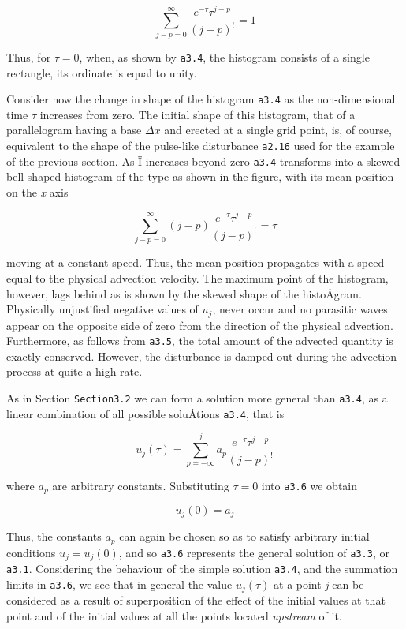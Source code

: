 {\[\sum_{j - p = 0}^{\infty}\frac{e^{- \tau}\tau^{j - p}}{\left( j - p \right)^{!}} = 1\]}

Thus, for \(\tau = 0\), when, as shown by \texttt{a3.4}, the histogram
consists of a single rectangle, its ordinate is equal to unity.

Consider now the change in shape of the histogram \texttt{a3.4} as the
non-dimensional time \(\tau\) increases from zero. The initial shape of
this histogram, that of a parallelogram having a base \(\Delta x\) and
erected at a single grid point, is, of course, equivalent to the shape
of the pulse-like disturbance \texttt{a2.16} used for the example of the
previous section. As Ï increases beyond zero \texttt{a3.4} transforms
into a skewed bell-shaped histogram of the type as shown in the figure,
with its mean position on the \emph{x} axis

\[\sum_{j - p = 0}^{\infty}\left( j - p \right)\frac{e^{- \tau}\tau^{j - p}}{\left( j - p \right)^{!}} = \tau\]

moving at a constant speed. Thus, the mean position propagates with a
speed equal to the physical advection velocity. The maximum point of the
histogram, however, lags behind as is shown by the skewed shape of the
histoÂ­gram. Physically unjustified negative values of \(u_{j}\), never
occur and no parasitic waves appear on the opposite side of zero from
the direction of the physical advection. Furthermore, as follows from
\texttt{a3.5}, the total amount of the advected quantity is exactly
conserved. However, the disturbance is damped out during the advection
process at quite a high rate.

As in Section \texttt{Section3.2} we can form a solution more general
than \texttt{a3.4}, as a linear combination of all possible soluÂ­tions
\texttt{a3.4}, that is

{\[u_{j}\left( \tau \right) = \sum_{p = - \infty}^{j}a_{p}\frac{e^{- \tau}\tau^{j - p}}{\left( j - p \right)^{!}}\]}

where \(a_{p}\) are arbitrary constants. Substituting \(\tau = 0\) into
\texttt{a3.6} we obtain

{\[u_{j}\left( 0 \right) = a_{j}\]}

Thus, the constants \(a_{p}\) can again be chosen so as to satisfy
arbitrary initial conditions \(u_{j} = u_{j}(0)\), and so \texttt{a3.6}
represents the general solution of \texttt{a3.3}, or \texttt{a3.1}.
Considering the behaviour of the simple solution \texttt{a3.4}, and the
summation limits in \texttt{a3.6}, we see that in general the value
\(u_{j}\left( \tau \right)\) at a point \emph{j} can be considered as a
result of superposition of the effect of the initial values at that
point and of the initial values at all the points located
\emph{upstream} of it.

